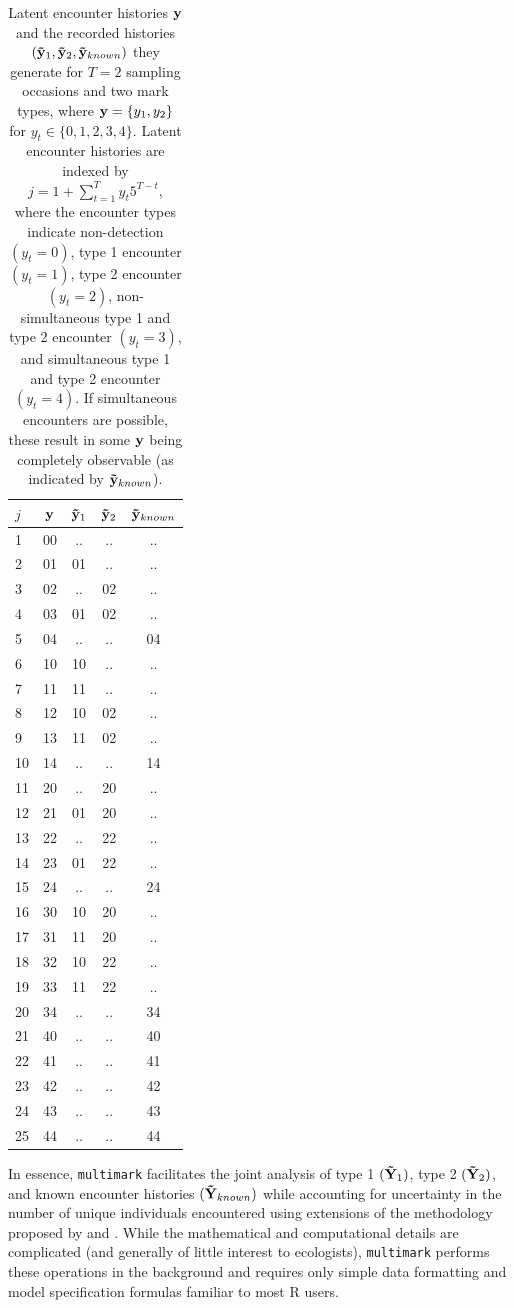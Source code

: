 \documentclass[12pt]{article}
\begin{document}
\begin{table}
  \caption{\label{tab:hist} Latent encounter histories ${\bf y}$ and the recorded histories $({\bf {\tilde y}}_1, {\bf {\tilde y}}_2, {\bf {\tilde y}}_{known})$ they generate for $T=2$ sampling occasions and two mark types, where ${\bf y}=\{y_1,y_2\}$ for $y_t \in \{0,1,2,3,4\}$. Latent encounter histories are indexed by $j=1+\sum_{t=1}^T y_t 5^{T-t}$, where the encounter types indicate non-detection $(y_t=0)$, type 1 encounter $(y_t=1)$, type 2 encounter $(y_t=2)$, non-simultaneous type 1 and type 2 encounter $(y_t=3)$, and simultaneous type 1 and type 2 encounter $(y_t=4)$. If simultaneous encounters are possible, these result in some ${\bf y}$ being completely observable (as indicated by ${\bf {\tilde y}}_{known}$).}
  \begin{tabular}{lc|ccc}
  \hline 
  $j$ & ${\bf y}$ & ${\bf {\tilde y}}_1$ &  ${\bf {\tilde y}}_2$ & ${\bf {\tilde y}}_{known}$ \tabularnewline
  \hline 
  1 & 00 & .. & .. & .. \tabularnewline
  2 & 01 & 01 & .. & .. \tabularnewline
  3 & 02 & .. & 02 & .. \tabularnewline
  4 & 03 & 01 & 02 & .. \tabularnewline
  5 & 04 & .. & .. & 04 \tabularnewline
  6 & 10 & 10 & .. & .. \tabularnewline
  7 & 11 & 11 & .. & .. \tabularnewline
  8 & 12 & 10 & 02 & .. \tabularnewline
  9 & 13 & 11 & 02 & .. \tabularnewline
  10 & 14 & .. & .. & 14 \tabularnewline
  11 & 20 & .. & 20 & .. \tabularnewline
  12 & 21 & 01 & 20 & .. \tabularnewline
  13 & 22 & .. & 22 & .. \tabularnewline
  14 & 23 & 01 & 22 & .. \tabularnewline
  15 & 24 & .. & .. & 24 \tabularnewline
  16 & 30 & 10 & 20 & .. \tabularnewline
  17 & 31 & 11 & 20 & .. \tabularnewline
  18 & 32 & 10 & 22 & .. \tabularnewline
  19 & 33 & 11 & 22 & .. \tabularnewline
  20 & 34 & .. & .. & 34 \tabularnewline
  21 & 40 & .. & .. & 40 \tabularnewline
  22 & 41 & .. & .. & 41 \tabularnewline
  23 & 42 & .. & .. & 42 \tabularnewline
  24 & 43 & .. & .. & 43 \tabularnewline
  25 & 44 & .. & .. & 44 \tabularnewline
  \hline 
  \end{tabular}
\end{table}

In essence, \verb|multimark| facilitates the joint analysis of type 1 $({\bf {\tilde Y}}_1)$, type 2 $({\bf {\tilde Y}}_2)$, and known encounter histories $({\bf {\tilde Y}}_{known})$ while accounting for uncertainty in the number of unique individuals encountered using extensions of the methodology proposed by \cite{BonnerHolmberg2013} and \cite{McClintockEtAl2013a}. While the mathematical and computational details are complicated (and generally of little interest to ecologists), \verb|multimark| performs these operations in the background and requires only simple data formatting and model specification formulas familiar to most R users.
\end{document}
